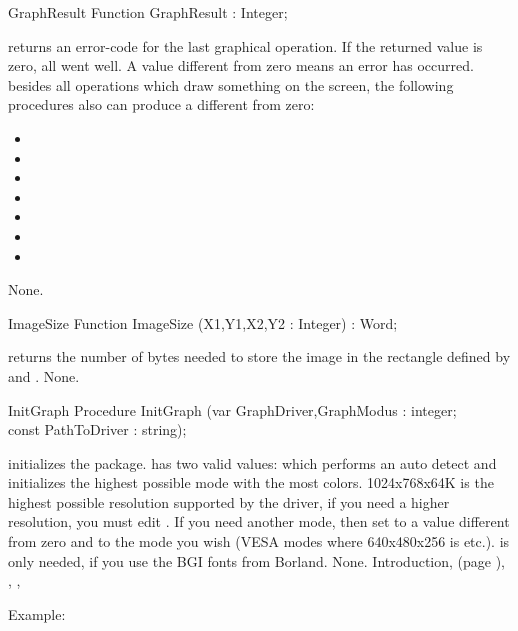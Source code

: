 \begin{function}{GraphResult}
\Declaration
Function GraphResult  : Integer;

\Description
{} returns an error-code for
the last graphical operation. If the returned value is zero, all went well.
A value different from zero means an error has occurred.
besides all operations which draw something on the screen, 
the following procedures also can produce a  different from
zero:

\begin{itemize}
\item {}
\item {}
\item {}
\item {}
\item {}
\item {}
\item {}
\end{itemize}

\Errors
None.
\SeeAlso
{}
\end{function}

\begin{function}{ImageSize}
\Declaration
Function ImageSize (X1,Y1,X2,Y2 : Integer) : Word;

\Description
{} returns
the number of bytes needed to store the image in the rectangle defined by
 and .
\Errors
None.
\SeeAlso
{}
\end{function}

\begin{procedure}{InitGraph}
\Declaration
Procedure InitGraph (var GraphDriver,GraphModus : integer;\\
const PathToDriver : string);

\Description

 initializes the  package.
 has two valid values:  which
performs an auto detect and initializes the highest possible mode with the most
colors. 1024x768x64K is the highest possible resolution supported by the
driver, if you need a higher resolution, you must edit . 
If you need another mode, then set  to a value different
from zero
and  to the mode you wish (VESA modes where 640x480x256
is  etc.).
 is only needed, if you use the BGI fonts from
Borland.
\Errors
None.
\SeeAlso
Introduction, (page \pageref{se:Introduction}),
, , 
\end{procedure}
Example:

